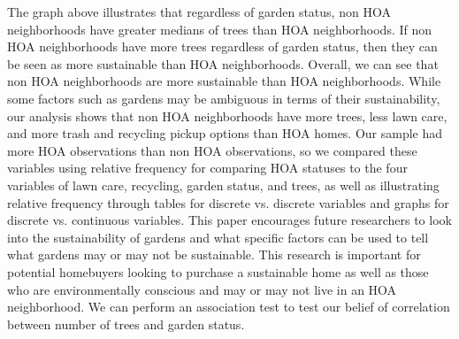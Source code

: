 \documentclass{article}
\begin{document}
\newline
The graph above illustrates that regardless of garden status, non HOA neighborhoods have greater medians of trees than HOA neighborhoods. If non HOA neighborhoods have more trees regardless of garden status, then they can be seen as more sustainable than HOA neighborhoods.
\newline
Overall, we can see that non HOA neighborhoods are more sustainable than HOA neighborhoods. While some factors such as gardens may be ambiguous in terms of their sustainability, our analysis shows that non HOA neighborhoods have more trees, less lawn care, and more trash and recycling pickup options than HOA homes. Our sample had more HOA observations than non HOA observations, so we compared these variables using relative frequency for comparing HOA statuses to the four variables of lawn care, recycling, garden status, and trees, as well as illustrating relative frequency through tables for discrete vs. discrete variables and graphs for discrete vs. continuous variables. This paper encourages future researchers to look into the sustainability of gardens and what specific factors can be used to tell what gardens may or may not be sustainable. This research is important for potential homebuyers looking to purchase a sustainable home as well as those who are environmentally conscious and may or may not live in an HOA neighborhood.
\newline
We can perform an association test to test our belief of correlation between number of trees and garden status. 
\newpage


\end{document}
